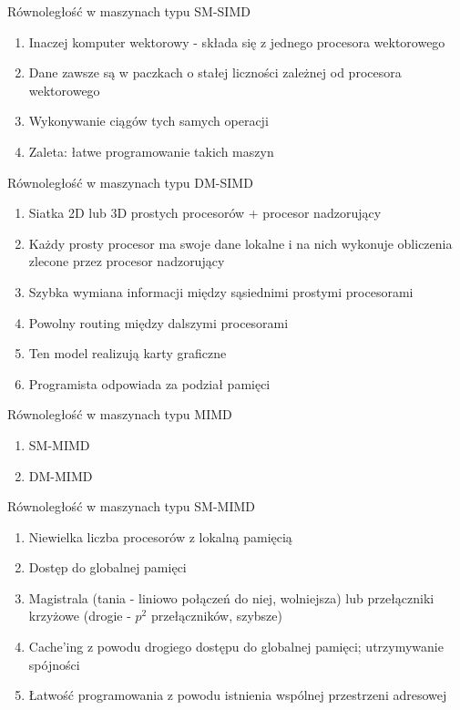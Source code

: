 \documentclass{beamer}
\begin{document}
\begin{frame}{Równoległość w maszynach typu SM-SIMD}
  \begin{enumerate}
  \item Inaczej komputer wektorowy - składa się z jednego procesora wektorowego
  \item Dane zawsze są w paczkach o stałej liczności zależnej od procesora wektorowego
  \item Wykonywanie ciągów tych samych operacji
  \item Zaleta: łatwe programowanie takich maszyn
  \end{enumerate}
\end{frame}

\begin{frame}{Równoległość w maszynach typu DM-SIMD}
  \begin{enumerate}
  \item Siatka 2D lub 3D prostych procesorów + procesor nadzorujący
  \item Każdy prosty procesor ma swoje dane lokalne i na nich wykonuje obliczenia zlecone przez procesor nadzorujący
  \item Szybka wymiana informacji między sąsiednimi prostymi procesorami
  \item Powolny routing między dalszymi procesorami
  \item Ten model realizują karty graficzne
  \item Programista odpowiada za podział pamięci
  \end{enumerate}
\end{frame}

\begin{frame}{Równoległość w maszynach typu MIMD}
  \begin{enumerate}
  \item SM-MIMD
  \item DM-MIMD
  \end{enumerate}
\end{frame}

\begin{frame}{Równoległość w maszynach typu SM-MIMD}
  \begin{enumerate}
  \item Niewielka liczba procesorów z lokalną pamięcią
  \item Dostęp do globalnej pamięci
  \item Magistrala (tania - liniowo połączeń do niej, wolniejsza) lub przełączniki krzyżowe (drogie - $p^2$ przełączników, szybsze)
  \item Cache'ing z powodu drogiego dostępu do globalnej pamięci; utrzymywanie spójności
  \item Łatwość programowania z powodu istnienia wspólnej przestrzeni adresowej
  \end{enumerate}
\end{frame}
\end{document}
